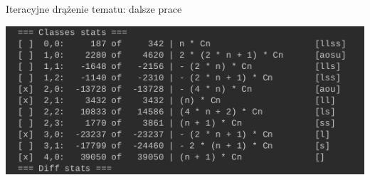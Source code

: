 \documentclass[final]{beamer}
\theoremstyle{bluetheorem}
\theoremstyle{bluetheorem}
\theoremstyle{greentheorem}
\begin{document}
\begin{frame}{Iteracyjne drążenie tematu: dalsze prace}
    \begin{block}{}
        \begin{center}
            \includegraphics[width=\textwidth]{framework_011.png}
        \end{center}
    \end{block}
\end{frame}
\end{document}
